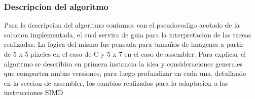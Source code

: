 \subsubsection{Descripcion del algoritmo}
\par
\bigskip
Para la descripcion del algoritmo contamos con el pseudocodigo acotado de la solucion implementada, el cual servira de guia para la interpretacion de las tareas realizadas. La logica del mismo 
fue pensada para tamaños de imagenes a partir de 5 x 5 pixeles en el caso de C y  5 x 7 en el caso de assembler. Para explicar el algoritmo se describira en primera instancia la idea y consideraciones generales que comparten ambas versiones; para luego profundizar en cada una, detallando en la seccion de assembler, los cambios realizados para la adaptacion a las instrucciones SIMD.
\par
\bigskip


